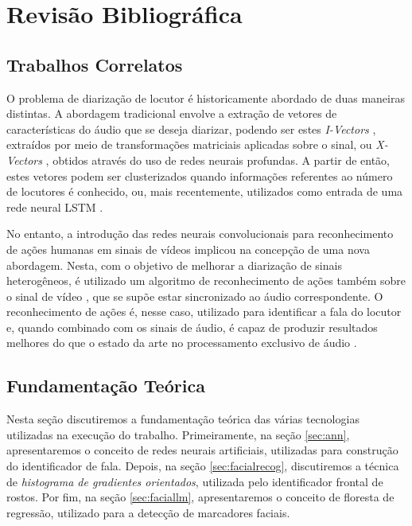 \chapter{Revisão Bibliográfica}

\section{Trabalhos Correlatos}
\label{sec:related-work}

O problema de diarização de locutor é historicamente abordado de duas maneiras distintas.
A abordagem tradicional envolve a extração de vetores de características do áudio que se deseja diarizar, podendo ser estes \textit{I-Vectors} \cite{dehakFrontEndFactorAnalysis2011}, extraídos por meio de transformações matriciais aplicadas sobre o sinal, ou \textit{X-Vectors} \cite{snyderXVectorsRobustDNN2018}, obtidos através do uso de redes neurais profundas.
A partir de então, estes vetores podem ser clusterizados \cite{sellSpeakerDiarizationPlda2014} quando informações referentes ao número de locutores é conhecido, ou, mais recentemente, utilizados como entrada de uma rede neural LSTM \cite{wangSpeakerDiarizationLSTM2018}.

No entanto, a introdução das redes neurais convolucionais para reconhecimento de ações humanas em sinais de vídeos \cite{ji3DConvolutionalNeural2013, karpathyLargeScaleVideoClassification2014} implicou na concepção de uma nova abordagem.
Nesta, com o objetivo de melhorar a diarização de sinais heterogêneos, é utilizado um algoritmo de reconhecimento de ações também sobre o sinal de vídeo \cite{hersheyAudiovisualGraphicalModels2004}, que se supõe estar sincronizado ao áudio correspondente.
O reconhecimento de ações é, nesse caso, utilizado para identificar a fala do locutor e, quando combinado com os sinais de áudio, é capaz de produzir resultados melhores do que o estado da arte no processamento exclusivo de áudio \cite{ephratLookingListenCocktail2018}.

\section{Fundamentação Teórica}

Nesta seção discutiremos a fundamentação teórica das várias tecnologias utilizadas na execução do trabalho. Primeiramente, na seção \ref{sec:ann}, apresentaremos o conceito de redes neurais artificiais, utilizadas para construção do identificador de fala. Depois, na seção \ref{sec:facialrecog}, discutiremos a técnica de \textit{histograma de gradientes orientados}, utilizada pelo identificador frontal de rostos. Por fim, na seção \ref{sec:faciallm}, apresentaremos o conceito de floresta de regressão, utilizado para a detecção de marcadores faciais.

